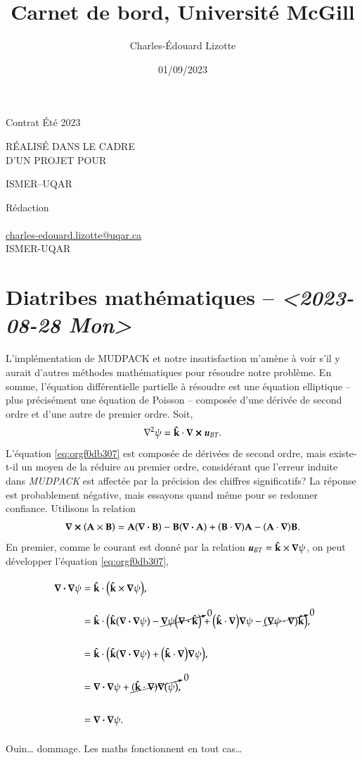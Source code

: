 \documentclass[10pt]{article}
\author{Charles-Édouard Lizotte}
\date{01/09/2023}
\title{Carnet de bord, Université McGill}
\makeatletter
\numberwithin{equation}{section}
\newcommand{\kvf}{\vb{\hat{k}}}
\newcommand{\uu}{\vb*{u}}
\newcommand{\venti}{\vphantom{\sum_x^x}}
\newcommand{\mytitlepage}{
\begin{titlepage}
\begin{center}
{\Large Contrat Été 2023 \par}
\vspace{2cm}
{\Large \MakeUppercase{\thetitle} \par}
\vspace{2cm}
RÉALISÉ DANS LE CADRE\\ D'UN PROJET POUR \par
\vspace{2cm}
{\Large ISMER--UQAR \par}
\vspace{2cm}
{\thedate}
\end{center}
\vfill
Rédaction \\
{\theauthor}\\
\url{charles-edouard.lizotte@uqar.ca}\\
ISMER-UQAR
\end{titlepage}
}
\makeatother
\begin{document}
\mytitlepage
\tableofcontents\newpage

\section{Diatribes mathématiques -- \textit{<2023-08-28 Mon>}}
\label{sec:org128dfcf}
L'implémentation de MUDPACK et notre insatisfaction m'amène à voir s'il y aurait d'autres méthodes mathématiques pour résoudre notre problème.
En somme, l'équation différentielle partielle à résoudre est une équation elliptique -- plus précisément une équation de Poisson -- composée d'une dérivée de second ordre et d'une autre de premier ordre.
Soit,
\begin{equation}
\label{eq:orgf0db307}
   \laplacian{\psi} = \kvf \cdot \curl{\uu_{BT}}.
\end{equation}
L'équation \ref{eq:orgf0db307} est composée de dérivées de second ordre, mais existe-t-il un moyen de la réduire au premier ordre, considérant que l'erreur induite dans \emph{MUDPACK} est affectée par la précision des chiffres significatifs?
La réponse est probablement négative, mais essayons quand même pour se redonner confiance.
Utilisons la relation
\begin{equation}
   \curl(\vb{A}\times\vb{B}) = \vb{A}\qty(\divergence{\vb{B}}) - \vb{B}\qty(\divergence{\vb{A}}) +\qty(\vb{B}\cdot\gradient)\vb{A} -\qty(\vb{A}\cdot\gradient)\vb{B}.
\end{equation}
En premier, comme le courant est donné par la relation \(\uu_{BT} = \kvf \times \gradient{\psi}\), on peut développer l'équation \ref{eq:orgf0db307},
\begin{align}
   \div{\gradient{\psi}}
   \venti&= \kvf \cdot \qty(\kvf \times \gradient{\psi}),\nonumber \\
   \venti&= \kvf \cdot \big(\kvf\qty(\divergence{\gradient{\psi}}) - \cancelto{0}{\gradient{\psi}\qty(\divergence{\kvf})} + \qty(\kvf\cdot\gradient) \gradient{\psi} - \cancelto{0}{\qty(\gradient{\psi} \cdot\gradient)\kvf} \big),\nonumber\\
   \venti&= \kvf \cdot \qty(\kvf\qty(\divergence{\gradient{\psi}}) + \qty(\kvf\cdot\gradient) \gradient{\psi}),\nonumber\\
   \venti&= \divergence{\gradient{\psi}} + \cancelto{0}{(\kvf\cdot\gradient)\gradient(\psi)},\nonumber\\
   \venti&=\divergence{\gradient{\psi}}.
\end{align}
Ouin\ldots{} dommage. Les maths fonctionnent en tout cas\ldots{}
\end{document}
